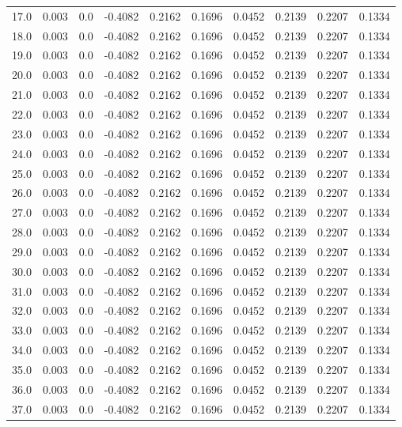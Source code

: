 \begin{longtable}{lrrrrrrrrr}
17.0 & 0.003 & 0.0 & -0.4082 & 0.2162 & 0.1696 & 0.0452 & 0.2139 & 0.2207 & 0.1334 \\
18.0 & 0.003 & 0.0 & -0.4082 & 0.2162 & 0.1696 & 0.0452 & 0.2139 & 0.2207 & 0.1334 \\
19.0 & 0.003 & 0.0 & -0.4082 & 0.2162 & 0.1696 & 0.0452 & 0.2139 & 0.2207 & 0.1334 \\
20.0 & 0.003 & 0.0 & -0.4082 & 0.2162 & 0.1696 & 0.0452 & 0.2139 & 0.2207 & 0.1334 \\
21.0 & 0.003 & 0.0 & -0.4082 & 0.2162 & 0.1696 & 0.0452 & 0.2139 & 0.2207 & 0.1334 \\
22.0 & 0.003 & 0.0 & -0.4082 & 0.2162 & 0.1696 & 0.0452 & 0.2139 & 0.2207 & 0.1334 \\
23.0 & 0.003 & 0.0 & -0.4082 & 0.2162 & 0.1696 & 0.0452 & 0.2139 & 0.2207 & 0.1334 \\
24.0 & 0.003 & 0.0 & -0.4082 & 0.2162 & 0.1696 & 0.0452 & 0.2139 & 0.2207 & 0.1334 \\
25.0 & 0.003 & 0.0 & -0.4082 & 0.2162 & 0.1696 & 0.0452 & 0.2139 & 0.2207 & 0.1334 \\
26.0 & 0.003 & 0.0 & -0.4082 & 0.2162 & 0.1696 & 0.0452 & 0.2139 & 0.2207 & 0.1334 \\
27.0 & 0.003 & 0.0 & -0.4082 & 0.2162 & 0.1696 & 0.0452 & 0.2139 & 0.2207 & 0.1334 \\
28.0 & 0.003 & 0.0 & -0.4082 & 0.2162 & 0.1696 & 0.0452 & 0.2139 & 0.2207 & 0.1334 \\
29.0 & 0.003 & 0.0 & -0.4082 & 0.2162 & 0.1696 & 0.0452 & 0.2139 & 0.2207 & 0.1334 \\
30.0 & 0.003 & 0.0 & -0.4082 & 0.2162 & 0.1696 & 0.0452 & 0.2139 & 0.2207 & 0.1334 \\
31.0 & 0.003 & 0.0 & -0.4082 & 0.2162 & 0.1696 & 0.0452 & 0.2139 & 0.2207 & 0.1334 \\
32.0 & 0.003 & 0.0 & -0.4082 & 0.2162 & 0.1696 & 0.0452 & 0.2139 & 0.2207 & 0.1334 \\
33.0 & 0.003 & 0.0 & -0.4082 & 0.2162 & 0.1696 & 0.0452 & 0.2139 & 0.2207 & 0.1334 \\
34.0 & 0.003 & 0.0 & -0.4082 & 0.2162 & 0.1696 & 0.0452 & 0.2139 & 0.2207 & 0.1334 \\
35.0 & 0.003 & 0.0 & -0.4082 & 0.2162 & 0.1696 & 0.0452 & 0.2139 & 0.2207 & 0.1334 \\
36.0 & 0.003 & 0.0 & -0.4082 & 0.2162 & 0.1696 & 0.0452 & 0.2139 & 0.2207 & 0.1334 \\
37.0 & 0.003 & 0.0 & -0.4082 & 0.2162 & 0.1696 & 0.0452 & 0.2139 & 0.2207 & 0.1334 \\

\end{longtable}
